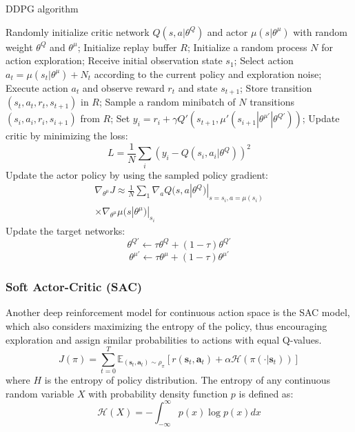 \documentclass{article}
\begin{document}
\begin{algorithm}[h]
	\caption{DDPG algorithm}
	\label{alg:ddpg}
	\begin{algorithmic}
		\STATE Randomly initialize critic network $Q(s,a|\theta^Q)$ and actor $\mu(s|\theta^\mu)$ with random weight $\theta^Q$ and $\theta^\mu$;
		\STATE Initialize replay buffer $R$;
			\STATE Initialize a random process $N$ for action exploration;
			\STATE Receive initial observation state $s_1$;
				\STATE Select action $a_t=\mu(s_t|\theta^\mu) + N_t$ according to the current policy and exploration noise;
				\STATE Execute action $a_t$ and observe reward $r_t$ and state $s_{t+1}$;
				\STATE Store transition $(s_t, a_t, r_t, s_{t+1})$ in $R$;
				\STATE Sample a random minibatch of $N$ transitions $(s_i , a_i , r_i , s_{i+1})$ from $R$;
				\STATE Set $y_i = r_i + \gamma Q'(s_{t+1}, \mu'(s_{i+1} | \theta^{\mu'} | \theta^{Q'} ))$;
				\STATE Update critic by minimizing the loss:$$L = \frac{1}{N} \sum_{i} {(y_i-Q(s_i, a_i | \theta^Q))}^2$$
				\STATE Update the actor policy by using the sampled policy gradient:
				\begin{multline*}
				\nabla_{\theta^\mu}J\approx\frac{1}{N}\sum_{1} \nabla_a Q(s,a|\theta^Q) |_{s=s_i, a=\mu(s_i)}\\
				\times \nabla_{\theta^\mu} \mu(s|\theta^\mu)|_{s_i}
				\end{multline*}
				\STATE Update the target networks:
				$$\theta^{Q'} \leftarrow \tau\theta^Q + (1-\tau)\theta^{Q'} $$
				$$\theta^{\mu'} \leftarrow \tau\theta^\mu + (1-\tau)\theta^{\mu'} $$
			\ENDFOR
		\ENDFOR
	\end{algorithmic}
\end{algorithm}

\subsubsection{Soft Actor-Critic (SAC)}

Another deep reinforcement model for continuous action space is the SAC model, which also considers maximizing the entropy of the policy, thus encouraging exploration and assign similar probabilities to actions with equal Q-values.
$$J(\pi) = \sum_{t=0}^{T} \mathbb{E}_{(\mathbf{s}_t, \mathbf{a}_t)\sim\rho_\pi} [r(\mathbf{s}_t, \mathbf{a}_t)+\alpha \mathcal{H} (\pi( \cdot | \mathbf{s}_t))]$$
where $H$ is the entropy of policy distribution. The entropy of any continuous random variable $X$ with probability
density function $p$ is defined as:
$$\mathcal{H}(X)=-\int_{-\infty}^{\infty} p(x)\log p(x)dx$$
\end{document}
